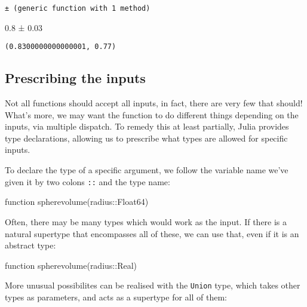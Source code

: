 \documentclass[
  letterpaper,
  DIV=11,
  numbers=noendperiod]{scrreprt}
\newenvironment{Shaded}{\begin{snugshade}}{\end{snugshade}}
\newcommand{\DataTypeTok}[1]{\textcolor[rgb]{0.68,0.00,0.00}{#1}}
\newcommand{\FloatTok}[1]{\textcolor[rgb]{0.68,0.00,0.00}{#1}}
\newcommand{\FunctionTok}[1]{\textcolor[rgb]{0.28,0.35,0.67}{#1}}
\newcommand{\KeywordTok}[1]{\textcolor[rgb]{0.00,0.23,0.31}{#1}}
\newcommand{\NormalTok}[1]{\textcolor[rgb]{0.00,0.23,0.31}{#1}}
\newcommand{\OperatorTok}[1]{\textcolor[rgb]{0.37,0.37,0.37}{#1}}
\begin{document}
\begin{verbatim}
± (generic function with 1 method)
\end{verbatim}

\begin{Shaded}
\begin{Highlighting}[]
\FloatTok{0.8} \OperatorTok{±} \FloatTok{0.03}
\end{Highlighting}
\end{Shaded}

\begin{verbatim}
(0.8300000000000001, 0.77)
\end{verbatim}

\hypertarget{prescribing-the-inputs}{%
\subsection{Prescribing the inputs}\label{prescribing-the-inputs}}

Not all functions should accept all inputs, in fact, there are very few
that should! What's more, we may want the function to do different
things depending on the inputs, via multiple dispatch. To remedy this at
least partially, Julia provides type declarations, allowing us to
prescribe what types are allowed for specific inputs.

To declare the type of a specific argument, we follow the variable name
we've given it by two colons \texttt{::} and the type name:

\begin{Shaded}
\begin{Highlighting}[]
\KeywordTok{function} \FunctionTok{spherevolume}\NormalTok{(radius}\OperatorTok{::}\DataTypeTok{Float64}\NormalTok{)}
\end{Highlighting}
\end{Shaded}

Often, there may be many types which would work as the input. If there
is a natural supertype that encompasses all of these, we can use that,
even if it is an abstract type:

\begin{Shaded}
\begin{Highlighting}[]
\KeywordTok{function} \FunctionTok{spherevolume}\NormalTok{(radius}\OperatorTok{::}\DataTypeTok{Real}\NormalTok{)}
\end{Highlighting}
\end{Shaded}

More unusual possibilites can be realised with the \texttt{Union} type,
which takes other types as parameters, and acts as a supertype for all
of them:
\end{document}

